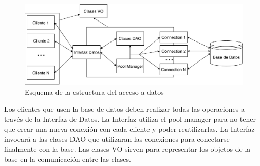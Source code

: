 \begin{figure}[H]
\centering
\includegraphics[scale = 0.5]{figuras/base_datos/Componentes.pdf}
\caption{Esquema de la estructura del acceso a datos}
\label{fig:componentesbases}
\end{figure}

Los clientes que usen la base de datos deben realizar todas las operaciones a través de la Interfaz de Datos. La Interfaz utiliza el pool manager para no tener que crear una nueva conexión con cada cliente y poder reutilizarlas. La Interfaz invocará a las clases DAO que utilizaran las conexiones para conectarse finalmente con la base. Las clases VO sirven para representar los objetos de la base en la comunicación entre las clases.\\

